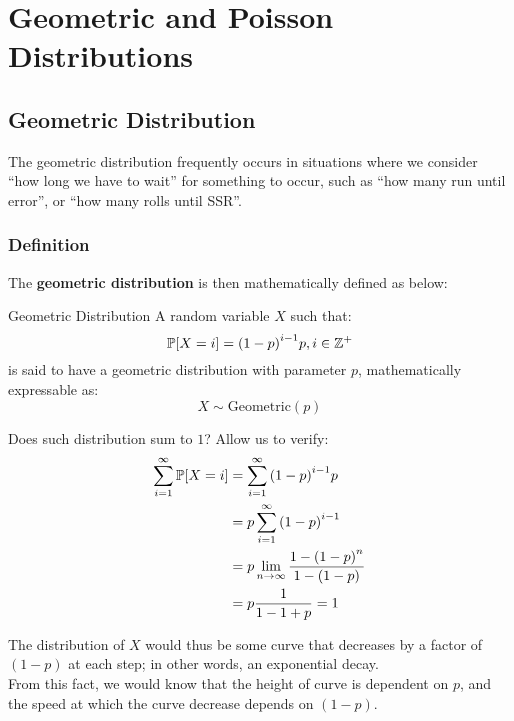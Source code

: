 \chapter{Geometric and Poisson Distributions}

\section{Geometric Distribution}
The geometric distribution frequently occurs in situations where we consider ``how long we have to wait'' for something to occur, such as ``how many run until error'', or ``how many rolls until SSR''.

\subsection{Definition}
The \textbf{geometric distribution} is then mathematically defined as below:
\begin{ln-define}{Geometric Distribution}{}
    A random variable $X$ such that:
    \[\P[X = i] = {(1 - p)}^{i - 1} p, i \in \Z^+\]
    is said to have a geometric distribution with parameter $p$, mathematically expressable as:
    \[X \sim \text{Geometric}(p)\]
\end{ln-define}
Does such distribution sum to $1$? Allow us to verify:
\begin{align*}
    \sum_{i = 1}^{\infty} \P[X = i]
    &= \sum_{i = 1}^{\infty} {(1 - p)}^{i - 1} p \\
    &= p \sum_{i = 1}^{\infty} {(1 - p)}^{i - 1} \\
    &= p \lim_{n \rightarrow \infty} \frac{1 - {(1 - p)}^{n}}{1 - (1 - p)} \\
    &= p \frac{1}{1 - 1 + p} = 1
\end{align*}

The distribution of $X$ would thus be some curve that decreases by a factor of $(1 - p)$ at each step; in other words, an exponential decay. \\
From this fact, we would know that the height of curve is dependent on $p$, and the speed at which the curve decrease depends on $(1 - p)$.

